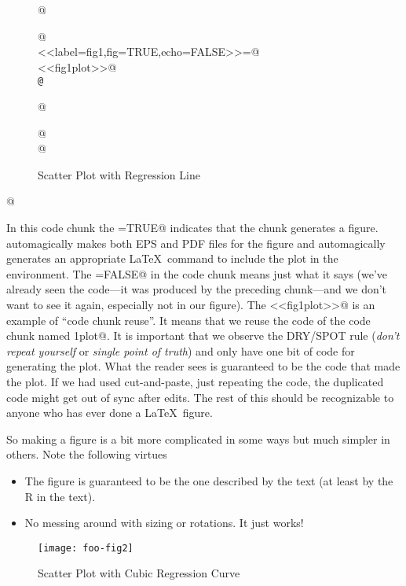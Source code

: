 \documentclass{article}
\begin{document}
\begin{tabbing}
\verb@\begin{figure}@ \\
\verb@\begin{center}@ \\
\verb@<<label=fig1,fig=TRUE,echo=FALSE>>=@ \\
\verb@<<fig1plot>>@ \\
\verb+@+ \\
\verb@\end{center}@ \\
\verb@\caption{Scatter Plot with Regression Line}@ \\
\verb@\label{fig:one}@ \\
\verb@\end{figure}@
\end{tabbing}

In this code chunk the \verb@fig=TRUE@ indicates that the chunk
generates a figure.  \verb@Sweave@ automagically makes both EPS and PDF
files for the figure and automagically generates an
appropriate \LaTeX\ \verb@{} command
to include the plot in the \verb@figure@ environment.
The \verb@echo=FALSE@ in the code chunk means just what it says
(we've already seen the code---it was produced by the preceding chunk---and
we don't want to see it again, especially not in our figure).
The \verb@<<fig1plot>>@ is an example of ``code chunk reuse''.
It means that we reuse the code of the code chunk named \verb@fig1plot@.
It is important that we observe the DRY/SPOT rule (\emph{don't repeat yourself}
or \emph{single point of truth}) and only have one bit of code for generating
the plot.  What the reader sees is guaranteed to be the code that made the
plot.  If we had used cut-and-paste, just repeating the code, the duplicated
code might get out of sync after edits.
The rest of this should be recognizable to anyone who has ever
done a \LaTeX\ figure.

So making a figure is a bit more complicated in some ways but much simpler
in others.  Note the following virtues

\begin{itemize}
\item The figure is guaranteed to be the one described by the text
(at least by the R in the text).
\item No messing around with sizing or rotations.  It just works!
\end{itemize}

\begin{figure}
\begin{center}
\texttt{[image: foo-fig2]}
\end{center}
\caption{Scatter Plot with Cubic Regression Curve}
\label{fig:two}
\end{figure}
\end{document}
